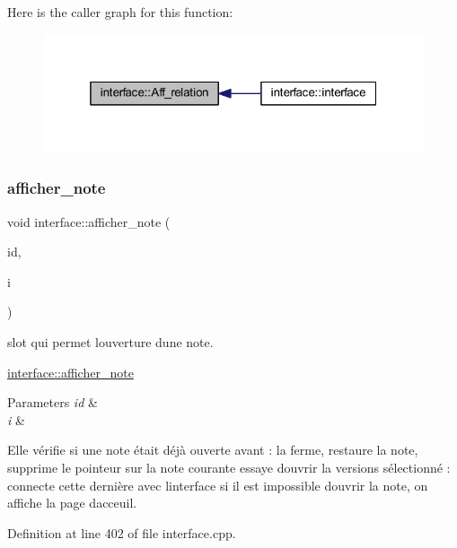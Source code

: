 Here is the caller graph for this function\+:\nopagebreak
\begin{figure}[H]
\begin{center}
\leavevmode
\includegraphics[width=319pt]{classinterface_a287c8a46ece12a94540a190b96b911c9_icgraph}
\end{center}
\end{figure}
\mbox{\label{classinterface_a320051a7a36aa24f53b12df82649f15f}} 
\subsubsection{\texorpdfstring{afficher\+\_\+note}{afficher\_note}}
{\footnotesize\ttfamily void interface\+::afficher\+\_\+note (\begin{DoxyParamCaption}\item[{Q\+String}]{id,  }\item[{int}]{i }\end{DoxyParamCaption})\hspace{0.3cm}{\ttfamily [slot]}}



slot qui permet l\textquotesingle{}ouverture d\textquotesingle{}une note. 

\hyperlink{classinterface_a320051a7a36aa24f53b12df82649f15f}{interface\+::afficher\+\_\+note} 
\begin{DoxyParams}{Parameters}
{\em id} & \\
\hline
{\em i} & \\
\hline
\end{DoxyParams}
Elle vérifie si une note était déjà ouverte avant \+: la ferme, restaure la note, supprime le pointeur sur la note courante essaye d\textquotesingle{}ouvrir la versions sélectionné \+: connecte cette dernière avec l\textquotesingle{}interface si il est impossible d\textquotesingle{}ouvrir la note, on affiche la page d\textquotesingle{}acceuil. 

Definition at line 402 of file interface.\+cpp.

